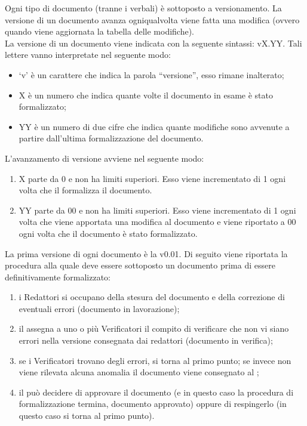 		 \label{sec:versioni}
			Ogni tipo di documento (tranne i verbali) è sottoposto a versionamento. La versione di un documento avanza ogniqualvolta viene fatta una modifica (ovvero quando viene aggiornata la tabella delle modifiche).\\
			La versione di un documento viene indicata con la seguente sintassi: vX.YY. Tali lettere vanno interpretate nel seguente modo:
			\begin{itemize}
				\item ‘v’ è un carattere che indica la parola “versione”, esso rimane inalterato;
				\item X è un numero che indica quante volte il documento in esame è stato formalizzato;
				\item YY è un numero di due cifre che indica quante modifiche sono avvenute a partire dall’ultima formalizzazione del documento.
			\end{itemize}
			L’avanzamento di versione avviene nel seguente modo:
			\begin{enumerate}
				\item X parte da 0 e non ha limiti superiori. Esso viene incrementato di 1 ogni volta che il  formalizza il documento.
				\item YY parte da 00 e non ha limiti superiori. Esso viene incrementato di 1 ogni volta che viene apportata una modifica al documento e viene riportato a 00 ogni volta che il documento è stato formalizzato.
			\end{enumerate}
			La prima versione di ogni documento è la v0.01.
			Di seguito viene riportata la procedura alla quale deve essere sottoposto un documento prima di essere definitivamente formalizzato:
			\begin{enumerate}
				\item i Redattori si occupano della stesura del documento e della correzione di eventuali errori (documento in lavorazione);
				\item il  assegna a uno o più Verificatori il compito di verificare che non vi siano errori nella versione consegnata dai redattori (documento in verifica);
				\item se i Verificatori trovano degli errori, si torna al primo punto; se invece non viene rilevata alcuna anomalia il documento viene consegnato al ;
				\item il  può decidere di approvare il documento (e in questo caso la procedura di formalizzazione termina, documento approvato) oppure di respingerlo (in questo caso si torna al primo punto).
			\end{enumerate}
